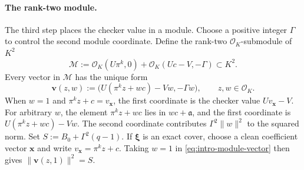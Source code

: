 \paragraph{The rank-two module.}
 The third step places the checker value in a module.  Choose a
 positive integer $\Gamma$ to control the second module coordinate.  Define
 the rank-two $\mathcal{O}_K$-submodule of $K^2$
\[
 \mathcal M
 :=\mathcal{O}_K(U\pi^k,0)
   +\mathcal{O}_K(Uc-V,-\Gamma)
 \subset K^2.
\]
Every vector in $\mathcal M$ has the unique form
\begin{equation}
\label{eq:intro-module-vector}
 \mathbf v(z,w)
 :=\bigl(U(\pi^kz+wc)-Vw,-\Gamma w\bigr),
 \qquad z,w\in\mathcal{O}_K.
\end{equation}
 When $w=1$ and $\pi^kz+c=v_{\mathbf x}$, the first coordinate is
 the checker value $Uv_{\mathbf x}-V$.  For arbitrary $w$, the
 element $\pi^kz+wc$ lies in $wc+\mathfrak a$, and the first coordinate is
 $U(\pi^kz+wc)-Vw$.  The second coordinate contributes
$\Gamma^2\|w\|^2$ to the squared norm.  Set
 $S:=B_0+\Gamma^2(q-1)$.  If $\boldsymbol\xi$ is an exact cover, choose
 a clean coefficient vector $\mathbf x$ and write
 $v_{\mathbf x}=\pi^kz+c$.  Taking $w=1$ in
\cref{eq:intro-module-vector} then gives
$\|\mathbf v(z,1)\|^2=S$.

